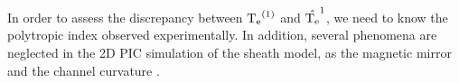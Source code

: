     In order to assess the discrepancy between  $\mathrm{T_e}^{(1)}$ and $\hat{\mathrm{T_e}}^1$, we need to know the polytropic index observed experimentally.
    In addition, several phenomena are neglected in the \ac{2D} \ac{PIC} simulation of the sheath model, as the magnetic mirror and the channel curvature \citep{heron2013,dominguez-vazquez2018}.
    
    
